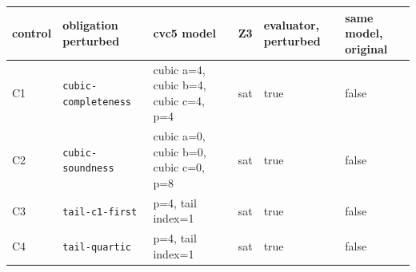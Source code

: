 \begin{tabular}{@{}llllll@{}}
\toprule
control & obligation perturbed & cvc5 model & Z3 & evaluator, perturbed & same model, original\\
\midrule
C1 & \texttt{cubic-completeness} & cubic a=4, cubic b=4, cubic c=4, p=4 & sat & true & false\\
C2 & \texttt{cubic-soundness} & cubic a=0, cubic b=0, cubic c=0, p=8 & sat & true & false\\
C3 & \texttt{tail-c1-first} & p=4, tail index=1 & sat & true & false\\
C4 & \texttt{tail-quartic} & p=4, tail index=1 & sat & true & false\\
\bottomrule
\end{tabular}
